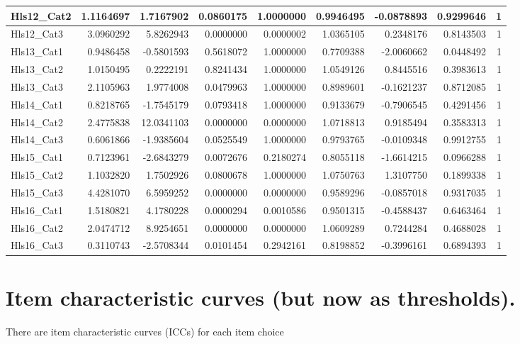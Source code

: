 \documentclass[
]{book}
\begin{document}
\begin{tabular}{l|r|r|r|r|r|r|r|r}
\hline
Hls12\_Cat2 & 1.1164697 & 1.7167902 & 0.0860175 & 1.0000000 & 0.9946495 & -0.0878893 & 0.9299646 & 1\\
\hline
Hls12\_Cat3 & 3.0960292 & 5.8262943 & 0.0000000 & 0.0000002 & 1.0365105 & 0.2348176 & 0.8143503 & 1\\
\hline
Hls13\_Cat1 & 0.9486458 & -0.5801593 & 0.5618072 & 1.0000000 & 0.7709388 & -2.0060662 & 0.0448492 & 1\\
\hline
Hls13\_Cat2 & 1.0150495 & 0.2222191 & 0.8241434 & 1.0000000 & 1.0549126 & 0.8445516 & 0.3983613 & 1\\
\hline
Hls13\_Cat3 & 2.1105963 & 1.9774008 & 0.0479963 & 1.0000000 & 0.8989601 & -0.1621237 & 0.8712085 & 1\\
\hline
Hls14\_Cat1 & 0.8218765 & -1.7545179 & 0.0793418 & 1.0000000 & 0.9133679 & -0.7906545 & 0.4291456 & 1\\
\hline
Hls14\_Cat2 & 2.4775838 & 12.0341103 & 0.0000000 & 0.0000000 & 1.0718813 & 0.9185494 & 0.3583313 & 1\\
\hline
Hls14\_Cat3 & 0.6061866 & -1.9385604 & 0.0525549 & 1.0000000 & 0.9793765 & -0.0109348 & 0.9912755 & 1\\
\hline
Hls15\_Cat1 & 0.7123961 & -2.6843279 & 0.0072676 & 0.2180274 & 0.8055118 & -1.6614215 & 0.0966288 & 1\\
\hline
Hls15\_Cat2 & 1.1032820 & 1.7502926 & 0.0800678 & 1.0000000 & 1.0750763 & 1.3107750 & 0.1899338 & 1\\
\hline
Hls15\_Cat3 & 4.4281070 & 6.5959252 & 0.0000000 & 0.0000000 & 0.9589296 & -0.0857018 & 0.9317035 & 1\\
\hline
Hls16\_Cat1 & 1.5180821 & 4.1780228 & 0.0000294 & 0.0010586 & 0.9501315 & -0.4588437 & 0.6463464 & 1\\
\hline
Hls16\_Cat2 & 2.0474712 & 8.9254651 & 0.0000000 & 0.0000000 & 1.0609289 & 0.7244284 & 0.4688028 & 1\\
\hline
Hls16\_Cat3 & 0.3110743 & -2.5708344 & 0.0101454 & 0.2942161 & 0.8198852 & -0.3996161 & 0.6894393 & 1\\
\hline
\end{tabular}

\hypertarget{item-characteristic-curves-but-now-as-thresholds.}{%
\section{Item characteristic curves (but now as thresholds).}\label{item-characteristic-curves-but-now-as-thresholds.}}

There are item characteristic curves (ICCs) for each item choice
\end{document}

